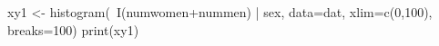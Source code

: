 \begin{Schunk}
\begin{Sinput}
 xy1 <-
 histogram(~I(numwomen+nummen)  | sex, data=dat, xlim=c(0,100), breaks=100)
 print(xy1)
\end{Sinput}
\end{Schunk}
